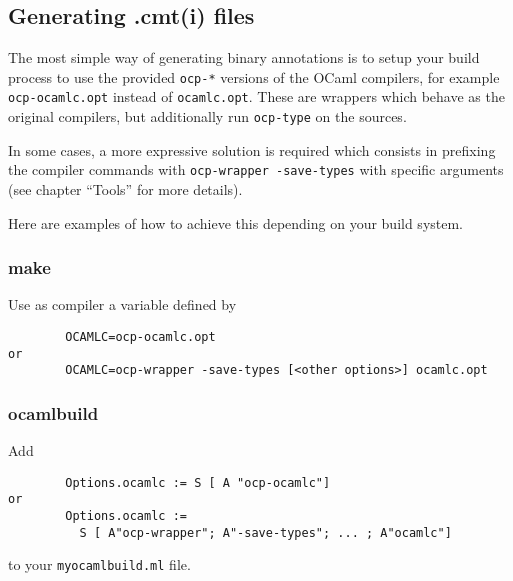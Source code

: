 \subsection{Generating .cmt(i) files}

The most simple way of generating binary annotations is to setup your
build process to use the provided \verb!ocp-*! versions of the OCaml
compilers, for example \verb!ocp-ocamlc.opt! instead of
\verb!ocamlc.opt!.  These are wrappers which behave as the original
compilers, but additionally run \verb!ocp-type! on the sources.

In some cases, a more expressive solution is required which
consists in prefixing the compiler commands with
\verb!ocp-wrapper -save-types! with specific arguments (see chapter
``Tools''
for more details).

Here are examples of how to achieve this depending on your build system.

\subsubsection{make}
Use as compiler a variable defined by
{\verbsize \begin{verbatim}
        OCAMLC=ocp-ocamlc.opt
or
        OCAMLC=ocp-wrapper -save-types [<other options>] ocamlc.opt
\end{verbatim}}


\subsubsection{ocamlbuild}
Add
{\verbsize \begin{verbatim}
        Options.ocamlc := S [ A "ocp-ocamlc"]
or
        Options.ocamlc :=
          S [ A"ocp-wrapper"; A"-save-types"; ... ; A"ocamlc"]
\end{verbatim}}
\noindent to your \verb!myocamlbuild.ml! file.


